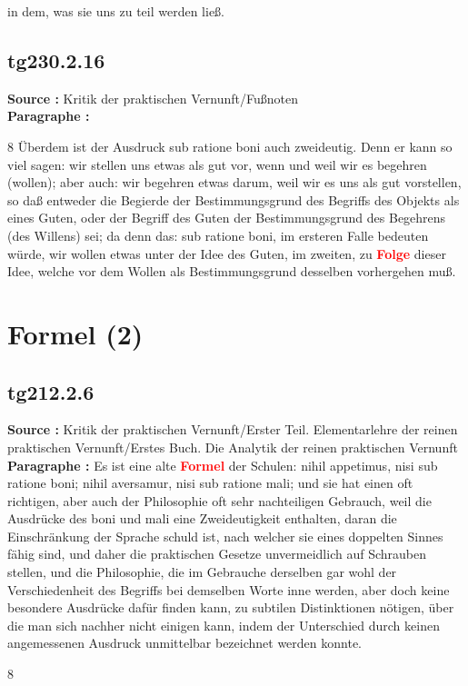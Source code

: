 \documentclass[a4paper,12pt,twoside]{book}
\newcommand{\match}[1]{\textcolor{red}{\textbf{#1}}}
\newcommand{\unnumberedsection}[1]{
	\section*{#1}
	\addcontentsline{toc}{section}{#1}
	\markright{#1}
}
\begin{document}
in dem, was sie uns zu teil werden ließ. 
	
	\subsection*{tg230.2.16} 
	\textbf{Source : }Kritik der praktischen Vernunft/Fußnoten\\  
	
	\noindent\textbf{Paragraphe : }
	
	8 Überdem ist der Ausdruck sub ratione boni auch zweideutig. Denn er kann so viel sagen: wir stellen uns etwas als gut vor, wenn und weil wir es begehren (wollen); aber auch: wir begehren etwas darum, weil wir es uns als gut vorstellen, so daß entweder die Begierde der Bestimmungsgrund des Begriffs des Objekts als eines Guten, oder der Begriff des Guten der Bestimmungsgrund des Begehrens (des Willens) sei; da denn das: sub ratione boni, im ersteren Falle bedeuten würde, wir wollen etwas unter der Idee des Guten, im zweiten, zu \match{Folge} dieser Idee, welche vor dem Wollen als Bestimmungsgrund desselben vorhergehen muß. 
	
	\unnumberedsection{Formel (2)} 
	\subsection*{tg212.2.6} 
	\textbf{Source : }Kritik der praktischen Vernunft/Erster Teil. Elementarlehre der reinen praktischen Vernunft/Erstes Buch. Die Analytik der reinen praktischen Vernunft\\  
	
	\noindent\textbf{Paragraphe : }Es ist eine alte \match{Formel} der Schulen: nihil appetimus, nisi sub ratione boni; nihil aversamur, nisi sub ratione mali; und sie hat einen oft richtigen, aber auch der Philosophie oft sehr nachteiligen Gebrauch, weil die Ausdrücke des boni und mali eine Zweideutigkeit enthalten, daran die Einschränkung der Sprache schuld ist, nach welcher sie eines doppelten Sinnes fähig sind, und daher die praktischen Gesetze unvermeidlich auf Schrauben stellen, und die Philosophie, die im Gebrauche derselben gar wohl der Verschiedenheit des Begriffs bei demselben Worte inne werden, aber doch keine besondere Ausdrücke dafür finden kann, zu subtilen Distinktionen nötigen, über die man sich nachher nicht einigen kann, indem der Unterschied durch keinen angemessenen Ausdruck unmittelbar bezeichnet werden konnte.
	
	
	8
	
	
	
\end{document}

